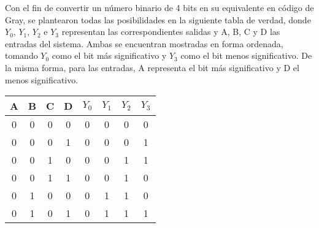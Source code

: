 \noindent
Con el fin de convertir un número binario de 4 bits en su equivalente en código de Gray, se plantearon todas las posibilidades en la siguiente tabla de verdad, donde $Y_0$, $Y_1$, $Y_2$ e $Y_3$ representan las correspondientes salidas y A, B, C y D las entradas del sistema. Ambas se encuentran mostradas en forma ordenada, tomando $Y_0$ como el bit m\'as significativo y $Y_3$ como el bit menos significativo. De la misma forma, para las entradas, A representa el bit m\'as significativo y D el menos significativo.

\begin{table}[h!]
\centering
\begin{tabular}{|cccc|cccc|}
\hline

\multicolumn{1}{|c}{A} & \multicolumn{1}{c}{B}   & \multicolumn{1}{c}{C}   & D                        & \multicolumn{1}{c}{$Y_0$}   & \multicolumn{1}{c}{$Y_1$}   & \multicolumn{1}{c}{$Y_2$}   & $Y_3$                        \\ \hline
\rowcolor[HTML]{34FF34} 
0                       & 0                        & 0                        & 0                        & \cellcolor[HTML]{FD6864}0 & \cellcolor[HTML]{FD6864}0 & \cellcolor[HTML]{FD6864}0 & \cellcolor[HTML]{FD6864}0 \\
\rowcolor[HTML]{34FF34} 
0                       & 0                        & 0                        & 1                        & \cellcolor[HTML]{FD6864}0 & \cellcolor[HTML]{FD6864}0 & \cellcolor[HTML]{FD6864}0 & \cellcolor[HTML]{FD6864}1 \\
\rowcolor[HTML]{34FF34} 
0                       & 0                        & 1                        & 0                        & \cellcolor[HTML]{FD6864}0 & \cellcolor[HTML]{FD6864}0 & \cellcolor[HTML]{FD6864}1 & \cellcolor[HTML]{FD6864}1 \\
\rowcolor[HTML]{34FF34} 
0                       & {\color[HTML]{333333} 0} & {\color[HTML]{333333} 1} & {\color[HTML]{333333} 1} & \cellcolor[HTML]{FD6864}0 & \cellcolor[HTML]{FD6864}0 & \cellcolor[HTML]{FD6864}1 & \cellcolor[HTML]{FD6864}0 \\
\rowcolor[HTML]{34FF34} 
0                       & {\color[HTML]{333333} 1} & {\color[HTML]{333333} 0} & {\color[HTML]{333333} 0} & \cellcolor[HTML]{FD6864}0 & \cellcolor[HTML]{FD6864}1 & \cellcolor[HTML]{FD6864}1 & \cellcolor[HTML]{FD6864}0 \\
\rowcolor[HTML]{34FF34} 
0                       & {\color[HTML]{333333} 1} & {\color[HTML]{333333} 0} & {\color[HTML]{333333} 1} & \cellcolor[HTML]{FD6864}0 & \cellcolor[HTML]{FD6864}1 & \cellcolor[HTML]{FD6864}1 & \cellcolor[HTML]{FD6864}1 \\

\end{tabular}
\end{table}
